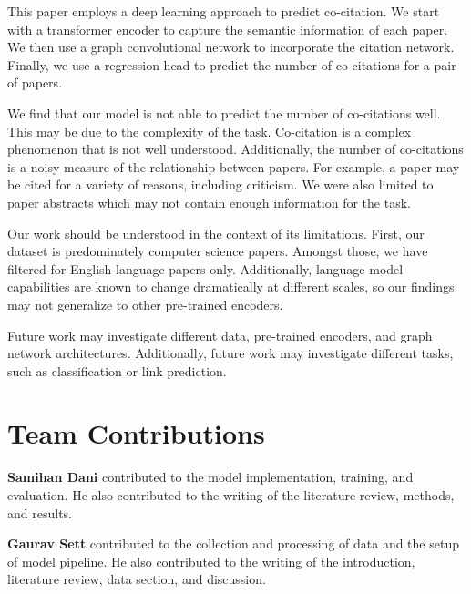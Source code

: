 \documentclass[10pt,twocolumn,letterpaper]{article}
\begin{document}
This paper employs a deep learning approach to predict co-citation. We start with a transformer encoder to capture the semantic information of each paper. We then use a graph convolutional network to incorporate the citation network. Finally, we use a regression head to predict the number of co-citations for a pair of papers. 

We find that our model is not able to predict the number of co-citations well. This may be due to the complexity of the task. Co-citation is a complex phenomenon that is not well understood. Additionally, the number of co-citations is a noisy measure of the relationship between papers. For example, a paper may be cited for a variety of reasons, including criticism. We were also limited to paper abstracts which may not contain enough information for the task.

Our work should be understood in the context of its limitations. First, our dataset is predominately computer science papers. Amongst those, we have filtered for English language papers only. Additionally, language model capabilities are known to change dramatically at different scales, so our findings may not generalize to other pre-trained encoders.

Future work may investigate different data, pre-trained encoders, and graph network architectures. Additionally, future work may investigate different tasks, such as classification or link prediction.

\section*{Team Contributions}

\textbf{Samihan Dani} contributed to the model implementation, training, and evaluation. He also contributed to the writing of the literature review, methods, and results.

\textbf{Gaurav Sett} contributed to the collection and processing of data and the setup of model pipeline. He also contributed to the writing of the introduction, literature review, data section, and discussion.


{\small


}
\end{document}
